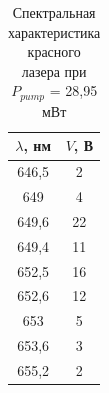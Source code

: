 \documentclass[a4paper,12pt]{report}
\begin{document}
\begin{table}[H]
\begin{tabular}{|c|c|}
\hline
$\lambda$, нм & $V$, В \\ \hline
646,5      & 2    \\ \hline
649        & 4    \\ \hline
649,6      & 22   \\ \hline
649,4      & 11   \\ \hline
652,5      & 16   \\ \hline
652,6      & 12   \\ \hline
653        & 5    \\ \hline
653,6      & 3    \\ \hline
655,2      & 2    \\ \hline
\end{tabular}
\caption{Спектральная характеристика красного лазера при $P_{pump}$ = 28,95 мВт}
\label{tab.10}
\end{table}
\end{document}
